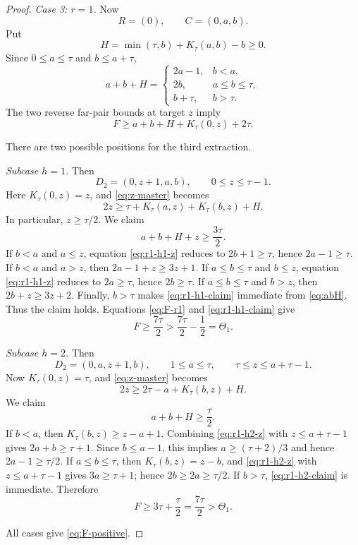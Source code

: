 \documentclass[11pt]{article}
\theoremstyle{definition}
\theoremstyle{remark}
\begin{document}
\begin{proof}
\medskip
\noindent\emph{Case 3: $r=1$.}
Now
\[
 R=(0),
 \qquad
 C=(0,a,b).
\]
Put
\begin{equation}
 H=\min(\tau,b)+K_\tau(a,b)-b\ge0.
 \label{eq:H-r1}
\end{equation}
Since $0\le a\le\tau$ and $b\le a+\tau$,
\begin{equation}
 a+b+H=
 \begin{cases}
  2a-1,&b<a,\\
  2b,&a\le b\le\tau,\\
  b+\tau,&b>\tau.
 \end{cases}
 \label{eq:abH}
\end{equation}
The two reverse far-pair bounds at target $z$ imply
\begin{equation}
 F\ge a+b+H+K_\tau(0,z)+2\tau.
 \label{eq:F-r1}
\end{equation}

There are two possible positions for the third extraction.

\smallskip
\noindent\emph{Subcase $h=1$.}
Then
\[
 D_2=(0,z+1,a,b),
 \qquad
 0\le z\le\tau-1.
\]
Here $K_\tau(0,z)=z$, and \eqref{eq:z-master} becomes
\begin{equation}
 2z\ge\tau+K_\tau(a,z)+K_\tau(b,z)+H.
 \label{eq:r1-h1-z}
\end{equation}
In particular, $z\ge\tau/2$.  We claim
\begin{equation}
 a+b+H+z\ge\frac{3\tau}{2}.
 \label{eq:r1-h1-claim}
\end{equation}
If $b<a$ and $a\le z$, equation \eqref{eq:r1-h1-z} reduces to
$2b+1\ge\tau$, hence $2a-1\ge\tau$.  If $b<a$ and $a>z$, then
$2a-1+z\ge3z+1$.  If $a\le b\le\tau$ and $b\le z$, equation
\eqref{eq:r1-h1-z} reduces to $2a\ge\tau$, hence $2b\ge\tau$.
If $a\le b\le\tau$ and $b>z$, then $2b+z\ge3z+2$.  Finally,
$b>\tau$ makes \eqref{eq:r1-h1-claim} immediate from
\eqref{eq:abH}.  Thus the claim holds.  Equations
\eqref{eq:F-r1} and \eqref{eq:r1-h1-claim} give
\[
 F\ge\frac{7\tau}{2}>\frac{7\tau}{2}-\frac12=\Theta_1.
\]

\smallskip
\noindent\emph{Subcase $h=2$.}
Then
\[
 D_2=(0,a,z+1,b),
 \qquad
 1\le a\le\tau,
 \qquad
 \tau\le z\le a+\tau-1.
\]
Now $K_\tau(0,z)=\tau$, and \eqref{eq:z-master} becomes
\begin{equation}
 2z\ge2\tau-a+K_\tau(b,z)+H.
 \label{eq:r1-h2-z}
\end{equation}
We claim
\begin{equation}
 a+b+H\ge\frac\tau2.
 \label{eq:r1-h2-claim}
\end{equation}
If $b<a$, then
$K_\tau(b,z)\ge z-a+1$.  Combining
\eqref{eq:r1-h2-z} with $z\le a+\tau-1$ gives
$2a+b\ge\tau+1$.  Since $b\le a-1$, this implies
$a\ge(\tau+2)/3$ and hence $2a-1\ge\tau/2$.  If
$a\le b\le\tau$, then $K_\tau(b,z)=z-b$, and
\eqref{eq:r1-h2-z} with $z\le a+\tau-1$ gives
$3a\ge\tau+1$; hence $2b\ge2a\ge\tau/2$.  If $b>\tau$,
\eqref{eq:r1-h2-claim} is immediate.  Therefore
\[
 F\ge3\tau+\frac\tau2
 =\frac{7\tau}{2}>\Theta_1.
\]

All cases give \eqref{eq:F-positive}.
\end{proof}
\end{document}
